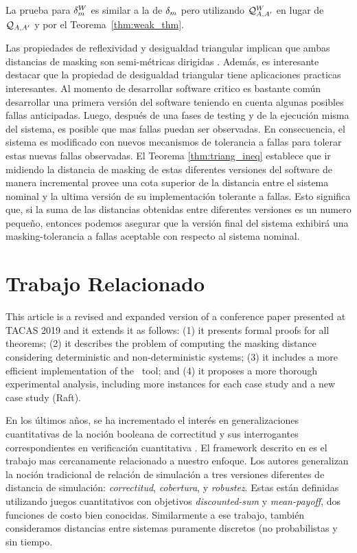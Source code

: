 La prueba para $\delta_{m}^W$ es similar a la de $\delta_{m}$ 
pero utilizando $\mathcal{Q}^W_{A,A'}$ en lugar de $\mathcal{Q}_{A, A'}$ y por el Teorema~\ref{thm:weak_thm}.

Las propiedades de reflexividad y desigualdad triangular implican que ambas distancias de masking son semi-métricas dirigidas \cite{CharikarMM06,AlfaroMRS08}. Además, es interesante destacar que la propiedad de desigualdad triangular tiene aplicaciones practicas interesantes. Al momento de desarrollar software critico es bastante común desarrollar una primera versión del software teniendo en cuenta algunas posibles fallas anticipadas. 
Luego, después de una fases de testing y de la ejecución misma del sistema, es posible que mas fallas puedan ser observadas. En consecuencia, el sistema es modificado con nuevos mecanismos de tolerancia a fallas para tolerar estas nuevas fallas observadas. 
El Teorema \ref{thm:triang_ineq} establece que ir midiendo la distancia de masking de estas diferentes versiones del software de manera incremental provee una cota superior de la distancia entre el sistema nominal y la ultima versión de su implementación tolerante a fallas. Esto significa que, si la suma de las distancias obtenidas entre diferentes versiones es un numero pequeño, entonces podemos asegurar que la versión final del sistema exhibirá una masking-tolerancia a fallas aceptable con respecto al sistema nominal.





\section{Trabajo Relacionado} \label{sec:related_work}

This article is a revised and expanded version of a conference paper presented at 
TACAS 2019 \cite{CastroDDP18b} and it extends it as follows:  
(1) it presents formal proofs for all theorems; (2) it describes the problem of computing  
the masking distance considering deterministic and 
non-deterministic systems; (3) it includes a more efficient implementation 
of the \MaskD~tool; and (4) it proposes a more thorough experimental analysis, including more 
instances for each case study and a new case study (Raft).

En los últimos años, se ha incrementado el interés en generalizaciones cuantitativas de la noción booleana de correctitud y sus interrogantes correspondientes en verificación cuantitativa \cite{BokerCHK14,CernyHR12,Henzinger10,Henzinger13}.
El framework descrito en \cite{CernyHR12} es el trabajo mas cercanamente relacionado a nuestro enfoque. 
Los autores generalizan la noción tradicional de relación de simulación a tres versiones diferentes de distancia de simulación: \emph{correctitud}, \emph{cobertura}, y \emph{robustez}.
Estas están definidas utilizando juegos cuantitativos con objetivos \emph{discounted-sum} 
y \emph{mean-payoff}, dos funciones de costo bien conocidas.
Similarmente a ese trabajo, también consideramos distancias entre sistemas puramente discretos (no probabilistas y sin tiempo.

